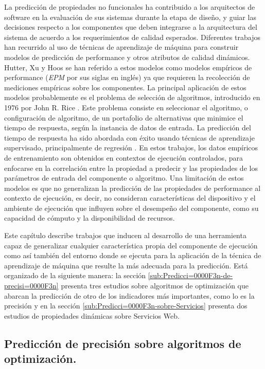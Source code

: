 La predicción de propiedades no funcionales ha contribuido a los arquitectos
de software en la evaluación de sus sistemas durante la etapa de diseño,
y guiar las decisiones respecto a los componentes que deben integrarse
a la arquitectura del sistema de acuerdo a los requerimientos de calidad
esperados. Diferentes trabajos han recurrido al uso de técnicas de
aprendizaje de máquina para construir modelos de predicción de performance
y otros atributos de calidad dinámicos. Hutter, Xu y Hoos \citep{Hutter2014}se
han referido a estos modelos como modelos empíricos de performance
(\emph{EPM} por sus siglas en inglés) ya que requieren la recolección
de mediciones empíricas sobre los componentes. La principal aplicación
de estos modelos probablemente es el problema de selección de algoritmos,
introducido en 1976 por John R. Rice \citep{Rice1976}. Este problema
consiste en seleccionar el algoritmo, o configuración de algoritmo,
de un portafolio de alternativas que minimice el tiempo de respuesta,
según la instancia de datos de entrada. La predicción del tiempo de
respuesta ha sido abordada con éxito usando técnicas de aprendizaje
supervisado, principalmente de regresión \citep{Hutter2014}. En estos
trabajos, los datos empíricos de entrenamiento son obtenidos en contextos
de ejecución controlados, para enfocarse en la correlación entre la
propiedad a predecir y las propiedades de los parámetros de entrada
del componente o algoritmo. Una limitación de estos modelos es que
no generalizan la predicción de las propiedades de performance al
contexto de ejecución, es decir, no consideran características del
dispositivo y el ambiente de ejecución que influyen sobre el desempeño
del componente, como su capacidad de cómputo y la disponibilidad de
recursos. 

Este capítulo describe trabajos que inducen al desarrollo de una herramienta
capaz de generalizar cualquier característica propia del componente
de ejecución como así también del entorno donde se ejecuta para la
aplicación de la técnica de aprendizaje de máquina que resulte la
más adecuada para la predicción. Está organizado de la siguiente manera:
la sección \ref{sub:Predicci=0000F3n-de-precisi=0000F3n} presenta
tres estudios sobre algoritmos de optimización que abarcan la predicción
de otro de los indicadores más importantes, como lo es la precisión
y en la sección \ref{sub:Predicci=0000F3n-sobre-Servicios} presenta
dos estudios de propiedades dinámicas sobre Servicios Web. 


\subsection{Predicción de precisión sobre algoritmos de optimización. \label{sub:Predicci=0000F3n-de-precisi=0000F3n}}

